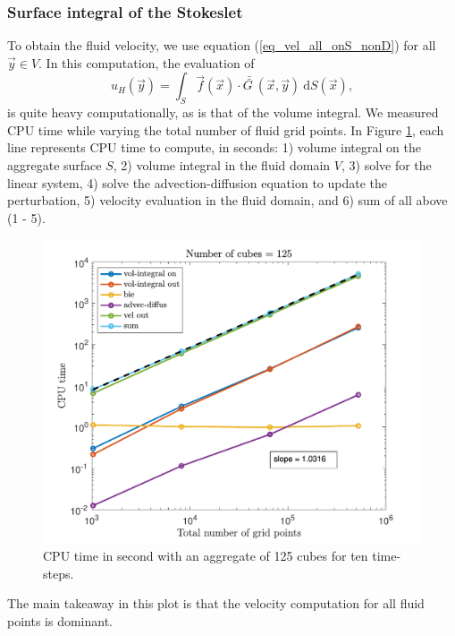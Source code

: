 \subsubsection{Surface integral of the Stokeslet}
To obtain the fluid velocity, we use equation (\ref{eq_vel_all_onS_nonD}) for all $\vec{y} \in V$. In this computation, the evaluation of
\begin{equation}
	u_H(\vec{y})  
	= \int_S \vec{f}(\vec{x}) \cdot \bar{\bar{G \ }}( \vec{x}, \vec{y}) \ \text{d} S(\vec{x}),
	\label{eq_uH}
\end{equation}
is quite heavy computationally, as is that of the volume integral. 
We measured CPU time while varying the total number of fluid grid points. 
In Figure \ref{fig_time_fmm_sum}, each line represents CPU time to compute, in seconds: 1) volume integral on the aggregate surface $S$, 2) volume integral in the fluid domain $V$, 3) solve for the linear system, 4) solve the advection-diffusion equation to update the perturbation, 5) velocity evaluation in the fluid domain, and 6) sum of all above (1 - 5).
\begin{figure}[ht]
	\begin{center}
		\includegraphics[scale=0.45]{./figures/fig_time_varNx5}
	\caption{CPU time in second with an aggregate of 125 cubes for ten time-steps.}
	\label{fig_time_fmm_sum}
\end{center}
\end{figure}
The main takeaway in this plot is that the velocity computation for all fluid points is dominant. 

